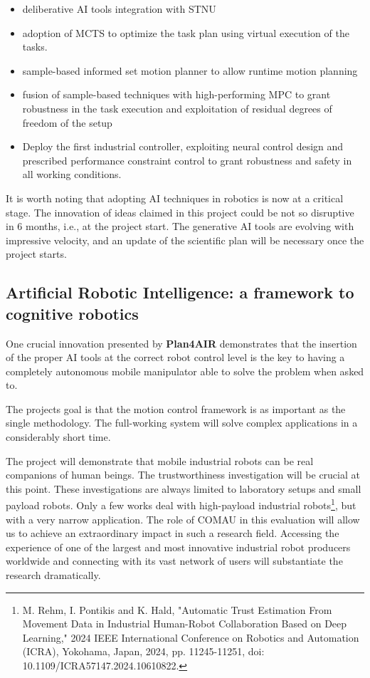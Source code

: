 \begin{itemize}
  \begin{itemize}
  \item
    deliberative AI tools integration with STNU
  \item
    adoption of MCTS to optimize the task plan using virtual execution
    of the tasks.
  \item
    sample-based informed set motion planner to allow runtime motion
    planning
  \item
    fusion of sample-based techniques with high-performing MPC to grant
    robustness in the task execution and exploitation of residual
    degrees of freedom of the setup
  \item
    Deploy the first industrial controller, exploiting neural control
    design and prescribed performance constraint control to grant
    robustness and safety in all working conditions.
  \end{itemize}
\end{itemize}

It is worth noting that adopting AI techniques in robotics is now at a
critical stage. The innovation of ideas claimed in this project could be
not so disruptive in 6 months, i.e., at the project start. The
generative AI tools are evolving with impressive velocity, and an update
of the scientific plan will be necessary once the project starts.

\subsection{Artificial Robotic Intelligence: a framework to cognitive
robotics}\label{artificial-robotic-intelligence-a-framework-to-cognitive-robotics}

One crucial innovation presented by \textbf{Plan4AIR} demonstrates that
the insertion of the proper AI tools at the correct robot control level
is the key to having a completely autonomous mobile manipulator able to
solve the problem when asked to.

The project\textquotesingle s goal is that the motion control framework
is as important as the single methodology. The full-working system will
solve complex applications in a considerably short time.

The project will demonstrate that mobile industrial robots can be real
companions of human beings. The trustworthiness investigation will be
crucial at this point. These investigations are always limited to
laboratory setups and small payload robots. Only a few works deal with
high-payload industrial robots\footnote{M. Rehm, I. Pontikis and K.
  Hald, "Automatic Trust Estimation From Movement Data in Industrial
  Human-Robot Collaboration Based on Deep Learning," 2024 IEEE
  International Conference on Robotics and Automation (ICRA), Yokohama,
  Japan, 2024, pp. 11245-11251, doi: 10.1109/ICRA57147.2024.10610822.},
but with a very narrow application. The role of COMAU in this evaluation
will allow us to achieve an extraordinary impact in such a research
field. Accessing the experience of one of the largest and most
innovative industrial robot producers worldwide and connecting with its
vast network of users will substantiate the research dramatically.

